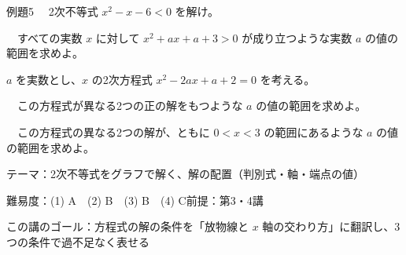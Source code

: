 \documentclass[paper=b5j, fontsize=8pt, fleqn, twoside]{jlreq}
\begin{document}
\begin{ascolorbox4A}[出典：オリジナル]{例題5}
  　2次不等式 $x^2-x-6<0$ を解け。\par
  　すべての実数 $x$ に対して $x^2+ax+a+3>0$ が成り立つような実数 $a$ の値の範囲を求めよ。\par
  $a$ を実数とし、$x$ の2次方程式 $x^2-2ax+a+2=0$ を考える。\par
  　この方程式が異なる2つの正の解をもつような $a$ の値の範囲を求めよ。\par
  　この方程式の異なる2つの解が、ともに $0<x<3$ の範囲にあるような $a$ の値の範囲を求めよ。
\end{ascolorbox4A}

\begin{Data}
  テーマ：2次不等式をグラフで解く、解の配置（判別式・軸・端点の値）\par
  難易度：(1) A　(2) B　(3) B　(4) C\quad 前提：第3・4講\par
  この講のゴール：方程式の解の条件を「放物線と $x$ 軸の交わり方」に翻訳し、3つの条件で過不足なく表せる
\end{Data}
\end{document}
